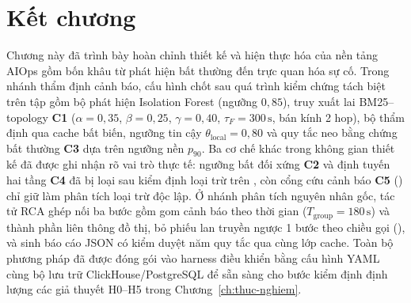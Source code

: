 \section{Kết chương}
\label{sec:ch4-ket-chuong}

Chương này đã trình bày hoàn chỉnh thiết kế và hiện thực hóa của nền tảng AIOps gồm bốn khâu từ phát hiện bất thường đến trực quan hóa sự cố. Trong nhánh thẩm định cảnh báo, cấu hình \CTAV{} chốt sau quá trình kiểm chứng tách biệt trên tập  gồm bộ phát hiện Isolation Forest (ngưỡng $0{,}85$), truy xuất lai BM25--topology \textbf{C1} ($\alpha = 0{,}35$, $\beta = 0{,}25$, $\gamma = 0{,}40$, $\tau_F = 300\,\text{s}$, bán kính 2 hop), bộ thẩm định  qua cache bất biến, ngưỡng tin cậy $\theta_{\text{local}} = 0{,}80$ và quy tắc neo bằng chứng bất thường \textbf{C3} dựa trên ngưỡng nền  $p_{90}$. Ba cơ chế khác trong không gian thiết kế đã được ghi nhận rõ vai trò thực tế: ngưỡng bất đối xứng \textbf{C2} và định tuyến hai tầng \textbf{C4} đã bị loại sau kiểm định loại trừ trên , còn cổng cứu cảnh báo \textbf{C5} () chỉ giữ làm phân tích loại trừ độc lập. Ở nhánh phân tích nguyên nhân gốc, tác tử RCA ghép nối ba bước gồm gom cảnh báo theo thời gian ($T_{\text{group}} = 180\,\text{s}$) và thành phần liên thông đồ thị, bỏ phiếu lan truyền ngược 1 bước theo chiều gọi (), và sinh báo cáo JSON có kiểm duyệt năm quy tắc qua cùng lớp cache. Toàn bộ phương pháp đã được đóng gói vào harness điều khiển bằng cấu hình YAML cùng bộ lưu trữ ClickHouse/PostgreSQL để sẵn sàng cho bước kiểm định định lượng các giả thuyết H0--H5 trong Chương~\ref{ch:thuc-nghiem}.
